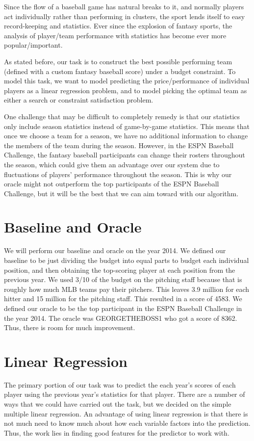 \documentclass[12pt]{amsart}
\begin{document}
Since the flow of a baseball game has natural breaks to it, and normally players act individually rather than performing in clusters, the sport lends itself to easy record-keeping and statistics. Ever since the explosion of fantasy sports, the analysis of player/team performance with statistics has become ever more popular/important. 
\vspace{.4cm}

As stated before, our task is to construct the best possible performing team (defined with a custom fantasy baseball score) under a budget constraint. To model this task, we want to model predicting the price/performance of individual players as a linear regression problem, and to model picking the optimal team as either a search or constraint satisfaction problem.
\vspace{.4cm}

One challenge that may be difficult to completely remedy is that our statistics only include season statistics instead of game-by-game statistics. This means that once we choose a team for a season, we have no additional information to change the members of the team during the season. However, in the ESPN Baseball Challenge, the fantasy baseball participants can change their rosters throughout the season, which could give them an advantage over our system due to fluctuations of players' performance throughout the season. This is why our oracle might not outperform the top participants of the ESPN Baseball Challenge, but it will be the best that we can aim toward with our algorithm.

\section{\large Baseline and Oracle}
We will perform our baseline and oracle on the year 2014. We defined our baseline to be just dividing the budget into equal parts to budget each individual position, and then obtaining the top-scoring player at each position from the previous year. We used 3/10 of the budget on the pitching staff because that is roughly how much MLB teams pay their pitchers. This leaves 3.9 million for each hitter and 15 million for the pitching staff. This resulted in a score of 4583. We defined our oracle to be the top participant in the ESPN Baseball Challenge in the year 2014. The oracle was GEORGETHEBOSS1 who got a score of 8362. Thus, there is room for much improvement.

\section{\large Linear Regression}
The primary portion of our task was to predict the each year's scores of each player using the previous year's statistics for that player. There are a number of ways that we could have carried out the task, but we decided on the simple multiple linear regression. An advantage of using linear regression is that there is not much need to know much about how each variable factors into the prediction. Thus, the work lies in finding good features for the predictor to work with.
\vspace{.4cm}
\end{document}
